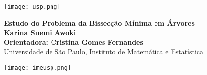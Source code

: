 \documentclass[a0,portrait]{a0poster}
\begin{document}


\begin{minipage}[b]{0.15\linewidth}
\texttt{[image: usp.png]}\\
\end{minipage}
\begin{minipage}[b]{0.70\linewidth}
\VeryHuge \center \color{NavyBlue} \textbf{Estudo do Problema da Bissecção Mínima em Árvores} \color{Black}\\ %
[1.2cm]
\huge \textbf{Karina Suemi Awoki}\\[0.6cm] %
\huge \textbf{Orientadora: Cristina Gomes Fernandes}\\[0.6cm] %

\huge Universidade de São Paulo, Instituto de Matemática e Estatística\\[0.5cm] %
\end{minipage}
%
\begin{minipage}[b]{0.15\linewidth}
\texttt{[image: imeusp.png]}\\
\end{minipage}

\vspace{2cm} %

\end{document}
